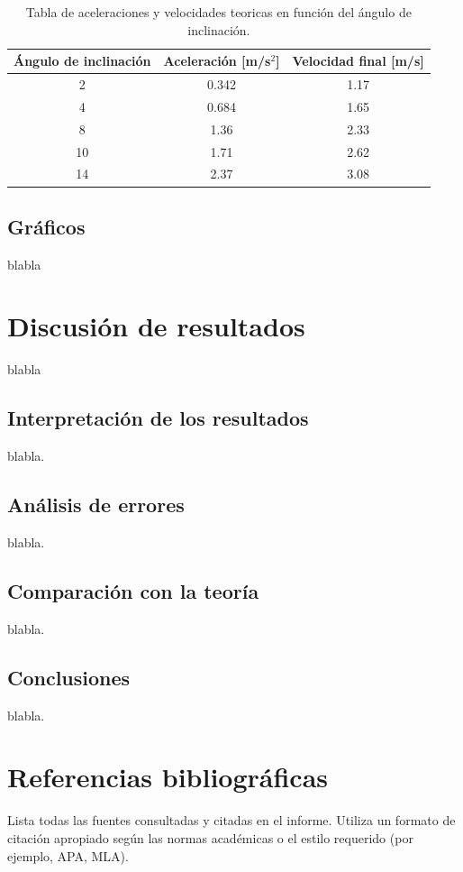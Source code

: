 \documentclass[twocolumn,12pt]{article}
\begin{document}
	\begin{table}[h!]
	\centering
	\begin{tabular}{|c|c|c|}
	\hline
	\textbf{Ángulo de inclinación} & \textbf{Aceleración [m/s\(^2\)]} & \textbf{Velocidad final [m/s]} \\ \hline
	2\textdegree & 0.342 & 1.17 \\ \hline
	4\textdegree & 0.684 & 1.65 \\ \hline
	8\textdegree & 1.36 & 2.33 \\ \hline
	10\textdegree & 1.71 & 2.62 \\ \hline
	14\textdegree & 2.37 & 3.08 \\ \hline
	\end{tabular}
	\caption{Tabla de aceleraciones y velocidades teoricas en función del ángulo de inclinación.}
	\label{tabla:caida_galileo}
	\end{table}
	

	\twocolumn

	\subsection{Gráficos}
	blabla
	
	\section{Discusión de resultados}
	blabla
	
	\subsection{Interpretación de los resultados}
	blabla.
	
	\subsection{Análisis de errores}
	blabla.
	
	\subsection{Comparación con la teoría}
	blabla.
	
	\subsection{Conclusiones}
	blabla.
	
	
	\section{Referencias bibliográficas}
	Lista todas las fuentes consultadas y citadas en el informe. Utiliza un formato de citación apropiado según las normas académicas o el estilo requerido (por ejemplo, APA, MLA).
\end{document}
